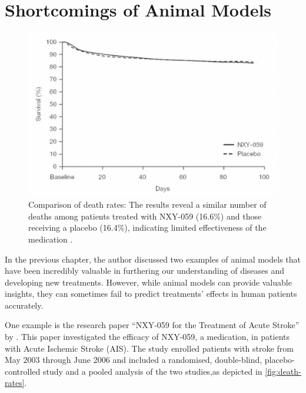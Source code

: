 \documentclass[10pt]{article}
\begin{document}
\begin{sloppypar}
  \section{Shortcomings of Animal Models}
  \label{sec:shortcomings}

  \vspace{10pt} %
  \begin{figure}[ht]
    \centering
    \includegraphics[width=\textwidth]{figures/death-rates.png}
    \caption[Comparison of death rates: The results reveal a similar number of deaths among patients treated with NXY-059 (16.6\%) and those receiving a placebo (16.4\%), indicating limited effectiveness of the medication]{Comparison of death rates: The results reveal a similar number of deaths among patients treated with NXY-059 (16.6\%) and those receiving a placebo (16.4\%), indicating limited effectiveness of the medication \citep{diener_nxy-059_2008}.}
    \label{fig:death-rates}
  \end{figure}

  In the previous chapter, the author discussed two examples of animal models that have been incredibly valuable in furthering our understanding of diseases and developing new treatments. However, while animal models can provide valuable insights, they can sometimes fail to predict treatments’ effects in human patients accurately.

  One example is the research paper “NXY-059 for the Treatment of Acute Stroke” by \cite{diener_nxy-059_2008}. This paper investigated the efficacy of NXY-059, a medication, in patients with Acute Ischemic Stroke (AIS). The study enrolled patients with stroke from May 2003 through June 2006 and included a randomised, double-blind, placebo-controlled study and a pooled analysis of the two studies,as depicted in \autoref{fig:death-rates}.


\end{sloppypar}
\end{document}
